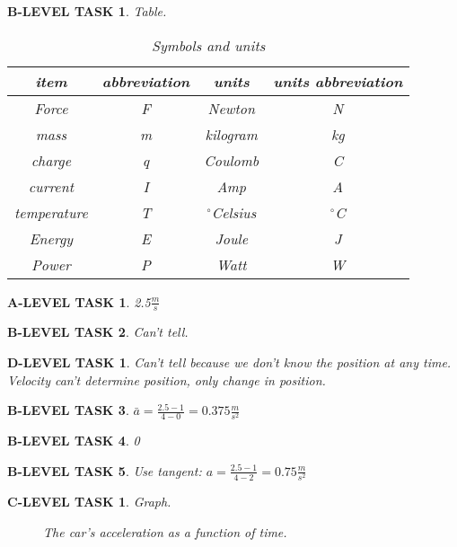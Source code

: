 \documentclass{book}
\numberwithin{equation}{section}
\newtheorem{alevel}{A-LEVEL TASK}
\newtheorem{blevel}{B-LEVEL TASK}
\newtheorem{clevel}{C-LEVEL TASK}
\newtheorem{dlevel}{D-LEVEL TASK}
\theoremstyle{definition}
\begin{document}
\begin{blevel}Table.\par
\begin{table}[H]
\begin{center}
\begin{tabular}{|c|c|c|c|} \hline
item	&	abbreviation & units & units abbreviation \\ \hline
Force	&	F	& Newton	& N\\ \hline
mass	&	m	& kilogram	&	kg	\\ \hline
charge	& q	& Coulomb& C	\\ \hline
current		&I&Amp&A	\\ \hline
temperature		&T&$^\circ$Celsius&$^\circ$C	\\ \hline
Energy	&E&Joule&J	\\ \hline
Power	&P&Watt&W	\\ \hline
\end{tabular}
\caption{Symbols and units}
\label{F:2SU}
\end{center}
\end{table}
\end{blevel}

\begin{alevel}2.5$\frac{m}{s}$\end{alevel}
\begin{blevel}Can't tell.\end{blevel}
\begin{dlevel}Can't tell because we don't know the position at any time. Velocity can't determine position, only change in position.\end{dlevel}
\begin{blevel}$\bar{a}=\frac{2.5-1}{4-0}=0.375\frac{m}{s^2}$\end{blevel}
\begin{blevel}0\end{blevel}
\begin{blevel}Use tangent: $a=\frac{2.5-1}{4-2}=0.75\frac{m}{s^2}$\end{blevel}

\begin{clevel} Graph.\par
\begin{figure}[H]
\begin{center}
\caption{The car's acceleration as a function of time.}
\label{F:2CAR}
\end{center}
\end{figure}
\end{clevel}
\end{document}
